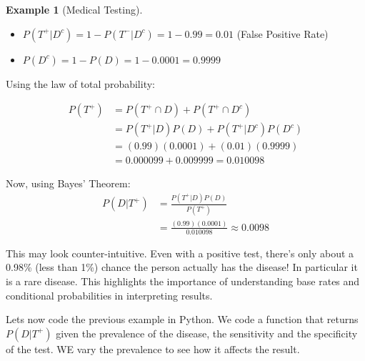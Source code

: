 \documentclass[
  letterpaper,
  DIV=11,
  numbers=noendperiod]{scrreport}
\providecommand{\tightlist}{%
  \setlength{\itemsep}{0pt}\setlength{\parskip}{0pt}}
\theoremstyle{definition}
\newtheorem{example}{Example}[chapter]
\theoremstyle{plain}
\theoremstyle{definition}
\theoremstyle{plain}
\theoremstyle{remark}
\begin{document}
\begin{tcolorbox}
\begin{example}[Medical
Testing]
\begin{itemize}
\tightlist
\item
  \(P(T^+|D^c) = 1 - P(T^-|D^c) = 1 - 0.99 = 0.01\) (False Positive
  Rate)
\item
  \(P(D^c) = 1 - P(D) = 1 - 0.0001 = 0.9999\)
\end{itemize}

Using the law of total probability:

\[
\begin{aligned}
P(T^+) &=P(T^+ \cap D)+P(T^+\cap D^c)\\
& =P(T^+|D)P(D) + P(T^+|D^c)P(D^c)\\
&= (0.99)(0.0001) + (0.01)(0.9999)\\
&= 0.000099 + 0.009999 = 0.010098
\end{aligned}
\]

Now, using Bayes' Theorem: \[
\begin{aligned}
P(D|T^+) &= \frac{P(T^+|D) P(D)}{P(T^+)} \\
&=   \frac{(0.99)(0.0001)}{0.010098} \approx 0.0098
\end{aligned}
\]

This may look counter-intuitive. Even with a positive test, there's only
about a 0.98\% (less than 1\%) chance the person actually has the
disease! In particular it is a rare disease. This highlights the
importance of understanding base rates and conditional probabilities in
interpreting results.

\end{example}

\end{tcolorbox}

Lets now code the previous example in Python. We code a function that
returns \(P(D|T^+)\) given the prevalence of the disease, the
sensitivity and the specificity of the test. WE vary the prevalence to
see how it affects the result.
\end{document}

